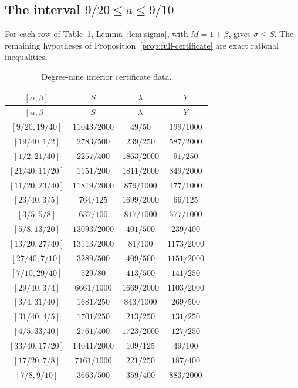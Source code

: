 \documentclass[11pt]{article}
\theoremstyle{remark}
\begin{document}
\subsection{The interval $9/20\le a\le9/10$}

For each row of Table~\ref{tab:nine}, Lemma~\ref{lem:sigma}, with
$M=1+\beta$, gives $\sigma\le S$.  The remaining hypotheses of
Proposition~\ref{prop:full-certificate} are exact rational inequalities.

\begin{longtable}{@{}c c c c@{}}
\caption{Degree-nine interior certificate data.}\label{tab:nine}\\
\toprule
$[\alpha,\beta]$ & $S$ & $\lambda$ & $Y$\\
\midrule
\endfirsthead
\toprule
$[\alpha,\beta]$ & $S$ & $\lambda$ & $Y$\\
\midrule
\endhead
$[9/20,19/40]$ & $11043/2000$ & $49/50$ & $199/1000$\\
$[19/40,1/2]$ & $2783/500$ & $239/250$ & $587/2000$\\
$[1/2,21/40]$ & $2257/400$ & $1863/2000$ & $91/250$\\
$[21/40,11/20]$ & $1151/200$ & $1811/2000$ & $849/2000$\\
$[11/20,23/40]$ & $11819/2000$ & $879/1000$ & $477/1000$\\
$[23/40,3/5]$ & $764/125$ & $1699/2000$ & $66/125$\\
$[3/5,5/8]$ & $637/100$ & $817/1000$ & $577/1000$\\
$[5/8,13/20]$ & $13093/2000$ & $401/500$ & $239/400$\\
$[13/20,27/40]$ & $13113/2000$ & $81/100$ & $1173/2000$\\
$[27/40,7/10]$ & $3289/500$ & $409/500$ & $1151/2000$\\
$[7/10,29/40]$ & $529/80$ & $413/500$ & $141/250$\\
$[29/40,3/4]$ & $6661/1000$ & $1669/2000$ & $1103/2000$\\
$[3/4,31/40]$ & $1681/250$ & $843/1000$ & $269/500$\\
$[31/40,4/5]$ & $1701/250$ & $213/250$ & $131/250$\\
$[4/5,33/40]$ & $2761/400$ & $1723/2000$ & $127/250$\\
$[33/40,17/20]$ & $14041/2000$ & $109/125$ & $49/100$\\
$[17/20,7/8]$ & $7161/1000$ & $221/250$ & $187/400$\\
$[7/8,9/10]$ & $3663/500$ & $359/400$ & $883/2000$\\
\bottomrule
\end{longtable}
\end{document}
